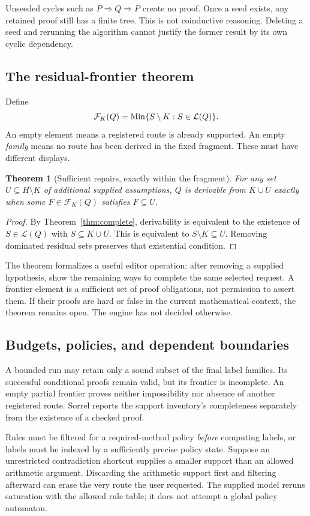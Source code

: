 \documentclass[11pt,a4paper]{article}
\newcommand{\Supp}{\mathcal L}\newcommand{\Front}{\mathcal F}
\numberwithin{equation}{section}
\newtheorem{theorem}{Theorem}[section]
\theoremstyle{definition}\newtheorem{definition}[theorem]{Definition}
\theoremstyle{remark}\newtheorem{remark}[theorem]{Remark}
\begin{document}
Unseeded cycles such as \(P\Rightarrow Q\Rightarrow P\) create no proof.
Once a seed exists, any retained proof still has a finite tree. This is not
coinductive reasoning. Deleting a seed and rerunning the algorithm cannot
justify the former result by its own cyclic dependency.

\subsection{The residual-frontier theorem}
Define
\[
 \Front_K(Q)=\Min\{S\setminus K:S\in\Supp(Q)\}.
\]
An empty element means a registered route is already supported. An empty
\emph{family} means no route has been derived in the fixed fragment. These
must have different displays.

\begin{theorem}[Sufficient repairs, exactly within the fragment]\label{thm:frontier}
For any set \(U\subseteq H\setminus K\) of additional supplied assumptions,
\(Q\) is derivable from \(K\cup U\) exactly when some
\(F\in\Front_K(Q)\) satisfies \(F\subseteq U\).
\end{theorem}
\begin{proof}
By Theorem~\ref{thm:complete}, derivability is equivalent to the existence of
\(S\in\Supp(Q)\) with \(S\subseteq K\cup U\). This is equivalent to
\(S\setminus K\subseteq U\). Removing dominated residual sets preserves
that existential condition.
\end{proof}

The theorem formalizes a useful editor operation: after removing a supplied
hypothesis, show the remaining ways to complete the same selected request.
A frontier element is a sufficient set of proof obligations, not permission
to assert them. If their proofs are hard or false in the current mathematical
context, the theorem remains open. The engine has not decided otherwise.

\subsection{Budgets, policies, and dependent boundaries}
A bounded run may retain only a sound subset of the final label families.
Its successful conditional proofs remain valid, but its frontier is
incomplete. An empty partial frontier proves neither impossibility nor absence
of another registered route. Sorrel reports the support inventory's
completeness separately from the existence of a checked proof.

Rules must be filtered for a required-method policy \emph{before} computing
labels, or labels must be indexed by a sufficiently precise policy state.
Suppose an unrestricted contradiction shortcut supplies a smaller support
than an allowed arithmetic argument. Discarding the arithmetic support first
and filtering afterward can erase the very route the user requested.
The supplied model reruns saturation with the allowed rule table; it does not
attempt a global policy automaton.
\end{document}
